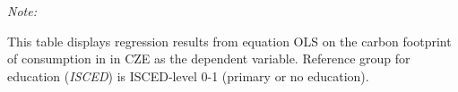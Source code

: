 \begin{table}[htbp!]
\begin{adjustbox}{width = 1\textwidth, max height = 0.95\textheight, center}
\begin{threeparttable}[b]
         \begin{tablenotes}\item \medskip \textit{Note:}
            \item This table displays regression results from equation OLS on the carbon footprint of consumption in  in CZE as the dependent variable.  Reference group for education (\textit{ISCED}) is ISCED-level 0-1 (primary or no education).
         \end{tablenotes}
      \end{threeparttable}
   \end{adjustbox}
\end{table}


